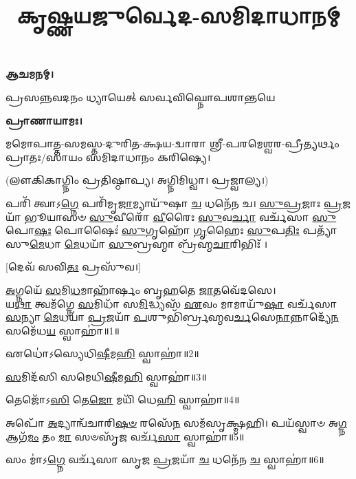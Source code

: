 \setmainfont[Scale=0.50,Script=Grantha,Mapping=tex-text,Mapping=devanagarinumerals,AutoFakeBold=2.0]{Noto Serif Grantha}
\title{\Huge 𑌕𑍃𑌷𑍍𑌣𑌯𑌜𑍁𑌰𑍍𑌵𑍇𑌦-𑌸𑌮𑌿𑌦𑌾𑌧𑌾𑌨𑌮𑍍}
\date{}
\maketitle
\tableofcontents 

\clearpage
{}

\textbf{𑌆𑌚𑌮𑌨𑌮𑍍।}

{𑌪𑍍𑌰𑌸𑌨𑍍𑌨𑌵𑌦𑌨𑌂 𑌧𑍍𑌯𑌾𑌯𑍇𑌤𑍍 𑌸𑌰𑍍𑌵𑌵𑌿𑌘𑍍𑌨𑍋𑌪𑌶𑌾𑌨𑍍𑌤𑌯𑍇}
 
\textbf{𑌪𑍍𑌰𑌾𑌣𑌾𑌯𑌾𑌮𑌃।} 

𑌮𑌮𑍋𑌪𑌾𑌤𑍍𑌤-𑌸𑌮𑌸𑍍𑌤-𑌦𑍁𑌰𑌿𑌤-𑌕𑍍𑌷𑌯-𑌦𑍍𑌵𑌾𑌰𑌾 𑌶𑍍𑌰𑍀-𑌪𑌰𑌮𑍇𑌶𑍍𑌵𑌰-𑌪𑍍𑌰𑍀𑌤𑍍𑌯𑌰𑍍𑌥𑌂 𑌪𑍍𑌰𑌾𑌤𑌃/𑌸𑌾𑌯𑌂 𑌸𑌮𑌿𑌦𑌾𑌧𑌾𑌨𑌂 𑌕𑌰𑌿𑌷𑍍𑌯𑍇।

(𑌲𑍗𑌕𑌿𑌕𑌾𑌗𑍍𑌨𑌿𑌂 𑌪𑍍𑌰𑌤𑌿𑌷𑍍𑌠𑌾𑌪𑍍𑌯। 𑌅𑌗𑍍𑌨𑌿𑌮𑌿𑌧𑍍𑌵𑌾। 𑌪𑍍𑌰𑌜𑍍𑌵𑌾𑌲𑍍𑌯।)

𑌪𑌰𑌿᳴ 𑌤𑍍𑌵𑌾𑌽\-\ul{𑌗𑍍𑌨𑍇} 𑌪𑌰𑌿᳴𑌮𑍃\-\ul{𑌜𑌾}\-𑌮𑍍𑌯𑌾𑌯𑍁᳴𑌷𑌾 \ul{𑌚} 𑌧𑌨𑍇᳴𑌨 𑌚। \ul{𑌸𑍁}\-\-\ul{𑌪𑍍𑌰}\-𑌜𑌾𑌃 \ul{𑌪𑍍𑌰}\-𑌜𑌯𑌾᳴ 𑌭𑍂𑌯𑌾𑌸𑍞 \ul{𑌸𑍁}\-𑌵𑍀𑌰𑍋᳴ \ul{𑌵𑍀}\-𑌰𑍈𑌃 \ul{𑌸𑍁}\-𑌵\-\ul{𑌰𑍍𑌚𑌾} 𑌵𑌰𑍍𑌚᳴𑌸𑌾 \ul{𑌸𑍁}\-𑌪𑍋\-\ul{𑌷𑌃} 𑌪𑍋𑌷𑍈𑌃॑ \ul{𑌸𑍁}\-𑌗𑍃𑌹𑍋᳴ \ul{𑌗𑍃}\-𑌹𑍈𑌃 \ul{𑌸𑍁}\-𑌪\-\ul{𑌤𑌿𑌃} 𑌪𑌤𑍍𑌯𑌾᳴ 𑌸𑍁\-\ul{𑌮𑍇}\-𑌧𑌾 \ul{𑌮𑍇}\-𑌧𑌯𑌾᳴ \ul{𑌸𑍁}\-𑌬𑍍𑌰𑌹𑍍𑌮𑌾 𑌬𑍍𑌰᳴𑌹𑍍𑌮\-\ul{𑌚𑌾}\-𑌰𑌿𑌭𑌿𑌃᳴ ।

[𑌦𑍇𑌵᳴ 𑌸𑌵𑌿\-\ul{𑌤𑌃} 𑌪𑍍𑌰𑌸𑍁᳴𑌵।]

\-\ul{𑌅}\-𑌗𑍍𑌨𑌯𑍇᳴ \ul{𑌸}\-𑌮𑌿\-\ul{𑌧}\-𑌮𑌾𑌹𑌾᳴𑌰𑍍\mbox{}𑌷𑌂 𑌬𑍃\-\ul{𑌹}\-𑌤𑍇 \ul{𑌜𑌾}\-𑌤𑌵𑍇᳴𑌦𑌸𑍇।\\
𑌯\-\ul{𑌥𑌾} 𑌤𑍍𑌵𑌮᳴𑌗𑍍𑌨𑍇 \ul{𑌸}\-𑌮𑌿𑌧𑌾᳴ 𑌸\-\ul{𑌮𑌿}\-𑌦𑍍𑌧𑍍𑌯𑌸᳴ \ul{𑌏}\-𑌵𑌂 𑌮𑌾𑌮𑌾𑌯𑍁᳴\-\ul{𑌷𑌾} 𑌵𑌰𑍍𑌚᳴𑌸𑌾 \ul{𑌸}\-𑌨𑍍𑌯𑌾 \ul{𑌮𑍇}\-𑌧𑌯𑌾॑ \ul{𑌪𑍍𑌰}\-𑌜𑌯𑌾᳴ \ul{𑌪}\-𑌶𑍁𑌭𑌿᳴𑌰𑍍𑌬𑍍𑌰𑌹𑍍𑌮𑌵\-\ul{𑌰𑍍𑌚}\-𑌸𑍇\-\ul{𑌨𑌾}\-𑌨𑍍𑌨𑌾𑌦𑍍𑌯𑍇᳴\-\ul{𑌨} 𑌸𑌮𑍇᳴𑌧\-\ul{𑌯} 𑌸𑍍𑌵𑌾𑌹𑌾॑॥1॥

𑌏𑌧𑍋॑𑌽𑌸𑍍𑌯𑍇𑌧𑌿\-\ul{𑌷𑍀}\-𑌮\-\ul{𑌹𑌿} 𑌸𑍍𑌵𑌾𑌹𑌾॑॥2॥

\-\ul{𑌸}\-𑌮𑌿𑌦᳴𑌸𑌿 𑌸𑌮𑍇𑌧𑌿\-\ul{𑌷𑍀}\-𑌮\-\ul{𑌹𑌿} 𑌸𑍍𑌵𑌾𑌹𑌾॑॥3॥

𑌤𑍇𑌜𑍋᳴𑌽\-\ul{𑌸𑌿} 𑌤𑍇\-\ul{𑌜𑍋} 𑌮𑌯𑌿᳴ 𑌧𑍇\-\ul{𑌹𑌿} 𑌸𑍍𑌵𑌾𑌹𑌾॑॥4॥

𑌅𑌪𑍋᳴ \ul{𑌅}\-𑌦𑍍𑌯𑌾𑌨𑍍𑌵᳴𑌚𑌾𑌰𑌿\-\ul{𑌷}\-\-\ul{𑍞} 𑌰𑌸𑍇᳴\-\ul{𑌨} 𑌸𑌮᳴𑌸𑍃𑌕𑍍𑌷𑍍𑌮𑌹𑌿। 𑌪𑌯᳴𑌸𑍍𑌵𑌾𑍞 𑌅\-\ul{𑌗𑍍𑌨} 𑌆𑌗᳴\-\ul{𑌮𑌂} 𑌤𑌂 \ul{𑌮𑌾} 𑌸𑍞𑌸𑍃᳴\-\ul{𑌜} 𑌵𑌰𑍍𑌚᳴\-\ul{𑌸𑌾} 𑌸𑍍𑌵𑌾𑌹𑌾॑॥5॥

𑌸𑌂 𑌮𑌾॑𑌽\-\ul{𑌗𑍍𑌨𑍇} 𑌵𑌰𑍍𑌚᳴𑌸𑌾 𑌸𑍃𑌜 \ul{𑌪𑍍𑌰}\-𑌜𑌯𑌾᳴ \ul{𑌚} 𑌧𑌨𑍇᳴𑌨 \ul{𑌚} 𑌸𑍍𑌵𑌾𑌹𑌾॑॥6॥

